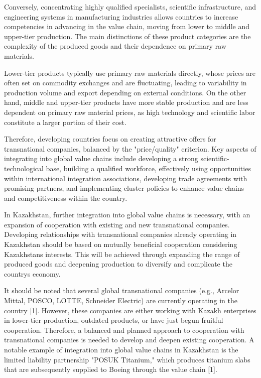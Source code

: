 \begin{multicols}{2}
Conversely, concentrating highly qualified specialists, scientific
infrastructure, and engineering systems in manufacturing industries
allows countries to increase competencies in advancing in the value
chain, moving from lower to middle and upper-tier production. The main
distinctions of these product categories are the complexity of the
produced goods and their dependence on primary raw materials.

Lower-tier products typically use primary raw materials directly, whose
prices are often set on commodity exchanges and are fluctuating, leading
to variability in production volume and export depending on external
conditions. On the other hand, middle and upper-tier products have more
stable production and are less dependent on primary raw material prices,
as high technology and scientific labor constitute a larger portion of
their cost.

Therefore, developing countries focus on creating attractive offers for
transnational companies, balanced by the "price/quality" criterion. Key
aspects of integrating into global value chains include developing a
strong scientific-technological base, building a qualified workforce,
effectively using opportunities within international integration
associations, developing trade agreements with promising partners, and
implementing cluster policies to enhance value chains and
competitiveness within the country.

In Kazakhstan, further integration into global value chains is
necessary, with an expansion of cooperation with existing and new
transnational companies. Developing relationships with transnational
companies already operating in Kazakhstan should be based on mutually
beneficial cooperation considering Kazakhstan\textquotesingle s
interests. This will be achieved through expanding the range of produced
goods and deepening production to diversify and complicate the
country\textquotesingle s economy.

It should be noted that several global transnational companies (e.g.,
Arcelor Mittal, POSCO, LOTTE, Schneider Electric) are currently
operating in the country {[}1{]}. However, these companies are either
working with Kazakh enterprises in lower-tier production, outdated
products, or have just begun fruitful cooperation. Therefore, a balanced
and planned approach to cooperation with transnational companies is
needed to develop and deepen existing cooperation. A notable example of
integration into global value chains in Kazakhstan is the limited
liability partnership "POSUK Titanium," which produces titanium slabs
that are subsequently supplied to Boeing through the value chain
{[}1{]}.


\end{multicols}
